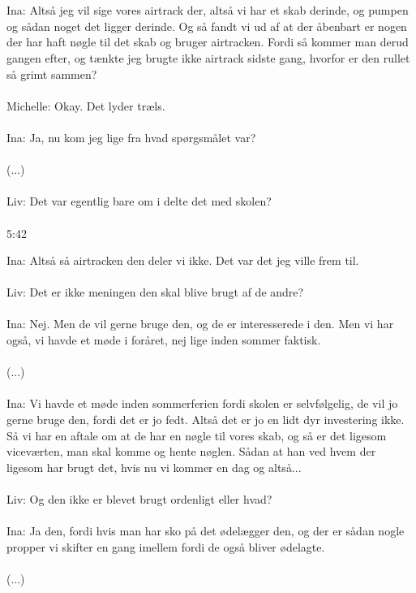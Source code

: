 \\\\
Ina: Altså jeg vil sige vores airtrack der, altså vi har et skab derinde, og pumpen og sådan noget det ligger derinde. Og så fandt vi ud af at der åbenbart er nogen der har haft nøgle til det skab og bruger airtracken. Fordi så kommer man derud gangen efter, og tænkte jeg brugte ikke airtrack sidste gang, hvorfor er den rullet så grimt sammen?
\\\\
Michelle: Okay. Det lyder træls.
\\\\
Ina: Ja, nu kom jeg lige fra hvad spørgsmålet var?
\\\\
(...)
\\\\
Liv: Det var egentlig bare om i delte det med skolen?
\\\\
5:42
\par
Ina: Altså så airtracken den deler vi ikke. Det var det jeg ville frem til. 
\\\\
Liv: Det er ikke meningen den skal blive brugt af de andre?
\\\\
Ina: Nej. Men de vil gerne bruge den, og de er interesserede i den. Men vi har også, vi havde et møde i foråret, nej lige inden sommer faktisk. 
\\\\
(...)
\\\\
Ina: Vi havde et møde inden sommerferien fordi skolen er selvfølgelig, de vil jo gerne bruge den, fordi det er jo fedt. Altså det er jo en lidt dyr investering ikke. Så vi har en aftale om at de har en nøgle til vores skab, og så er det ligesom viceværten, man skal komme og hente nøglen. Sådan at han ved hvem der ligesom har brugt det, hvis nu vi kommer en dag og altså...
\\\\
Liv: Og den ikke er blevet brugt ordenligt eller hvad?
\\\\
Ina: Ja den, fordi hvis man har sko på det ødelægger den, og der er sådan nogle propper vi skifter en gang imellem fordi de også bliver ødelagte. 
\\\\
(...)
\\\\
